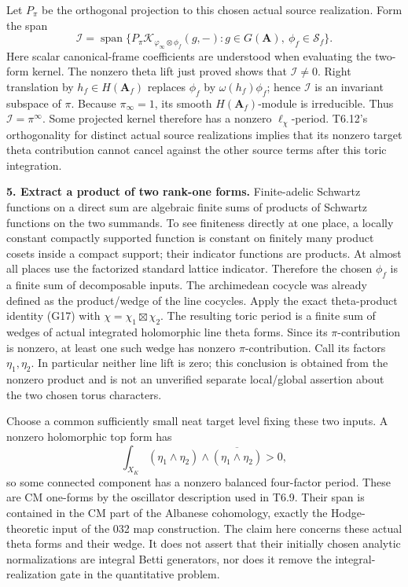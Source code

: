 Let \(P_\pi\) be the orthogonal projection to this chosen actual source realization. Form the span \[
\mathcal I=\operatorname{span}\{P_\pi\mathcal K_{\varphi_\infty\otimes\phi_f}(g,-):
                  g\in G(\mathbf A),\ \phi_f\in\mathcal S_f\}.
\] Here scalar canonical-frame coefficients are understood when evaluating the two-form kernel. The nonzero theta lift just proved shows that \(\mathcal I\ne0\). Right translation by \(h_f\in H(\mathbf A_f)\) replaces \(\phi_f\) by \(\omega(h_f)\phi_f\); hence \(\mathcal I\) is an invariant subspace of \(\pi\). Because \(\pi_\infty=1\), its smooth \(H(\mathbf A_f)\)-module is irreducible. Thus \(\mathcal I=\pi^\infty\). Some projected kernel therefore has a nonzero \(\ell_\chi\)-period. T6.12's orthogonality for distinct actual source realizations implies that its nonzero target theta contribution cannot cancel against the other source terms after this toric integration.

\textbf{5. Extract a product of two rank-one forms.} Finite-adelic Schwartz functions on a direct sum are algebraic finite sums of products of Schwartz functions on the two summands. To see finiteness directly at one place, a locally constant compactly supported function is constant on finitely many product cosets inside a compact support; their indicator functions are products. At almost all places use the factorized standard lattice indicator. Therefore the chosen \(\phi_f\) is a finite sum of decomposable inputs. The archimedean cocycle was already defined as the product/wedge of the line cocycles. Apply the exact theta-product identity (G17) with \(\chi=\chi_1\boxtimes\chi_2\). The resulting toric period is a finite sum of wedges of actual integrated holomorphic line theta forms. Since its \(\pi\)-contribution is nonzero, at least one such wedge has nonzero \(\pi\)-contribution. Call its factors \(\eta_1,\eta_2\). In particular neither line lift is zero; this conclusion is obtained from the nonzero product and is not an unverified separate local/global assertion about the two chosen torus characters.

Choose a common sufficiently small neat target level fixing these two inputs. A nonzero holomorphic top form has \[
\int_{X_K}(\eta_1\wedge\eta_2)\wedge
                  \overline{(\eta_1\wedge\eta_2)}>0,
\] so some connected component has a nonzero balanced four-factor period. These are CM one-forms by the oscillator description used in T6.9. Their span is contained in the CM part of the Albanese cohomology, exactly the Hodge-theoretic input of the 032 map construction. The claim here concerns these actual theta forms and their wedge. It does not assert that their initially chosen analytic normalizations are integral Betti generators, nor does it remove the integral-realization gate in the quantitative problem.

